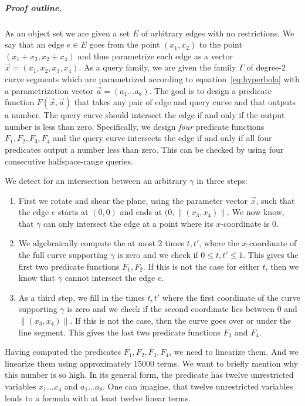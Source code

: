 \documentclass[UKenglish]{lipics-v2019}
\begin{document}
\subparagraph*{Proof outline.}
As an object set we are given a set $E$ of arbitrary edges with no restrictions. We say that an edge $e \in E$ goes from the point $(x_1, x_2)$ to the point $(x_1 + x_3, x_2 + x_4)$ and thus parametrize each edge as a vector $\vec{x} = (x_1, x_2, x_3, x_4)$. As a query family, we are given the family $\Gamma$ of degree-2 curve segments which are parametrized according to equation~\ref{eq:hyperbola} with a parametrization vector $\vec{a} = (a_1 \ldots a_8)$. The goal is to design a predicate function $F(\vec{x}, \vec{a})$ that takes any pair of edge and query curve and that outputs a number. The query curve should intersect the edge if and only if the output number is less than zero. Specifically, we design \emph{four} predicate functions $F_1, F_2, F_3, F_4$ and the query curve intersects the edge if and only if all four predicates output a number less than zero. This can be checked by using four consecutive halfspace-range queries.

We detect for an intersection between an arbitrary $\gamma$ in three steps:
\begin{enumerate}
    \item First we rotate and shear the plane, using the parameter vector $\vec{x}$, such that the edge $e$ starts at $(0,0)$ and ends at $(0, \lVert (x_3, x_4) \rVert$. We now know, that $\gamma$ can only intersect the edge at a point where its $x$-coordinate is $0$. 
    \item We algebraically compute the at most 2 times $t, t'$, where the $x$-coordinate of the full curve supporting $\gamma$ is zero and we check if $0 \le t, t' \le 1$. This gives the first two predicate functions $F_1, F_2$. If this is not the case for either $t$, then we know that $\gamma$ cannot intersect the edge $e$.
    \item As a third step, we fill in the times $t, t'$ where the first coordinate of the curve supporting $\gamma$ is zero and we check if the second coordinate lies between $0$ and $ \lVert (x_3, x_4) \rVert$. If this is not the case, then the curve goes over or under the line segment. This gives the last two predicate functions $F_3$ and $F_4$.
\end{enumerate}

Having computed the predicates $F_1, F_2, F_3, F_4$, we need to linearize them. And we linearize them using approximately 15000 terms. We want to briefly mention why this number is so high. In its general form, the predicate has twelve unrestricted variables $x_1 \ldots x_4$ and $a_1 \ldots a_8$. One can imagine, that twelve unrestricted variables leads to a formula with at least twelve linear terms.
\end{document}
